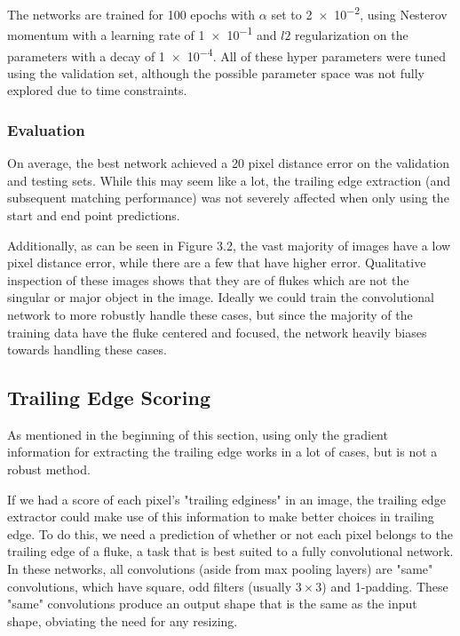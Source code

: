 The networks are trained for 100 epochs with $\alpha$ set to \num{2e-2}, using Nesterov momentum with a learning rate of \num{1e-1} and $l2$ regularization on the parameters with a decay of \num{1e-4}.
All of these hyper parameters were tuned using the validation set, although the possible parameter space was not fully explored due to time constraints.

\subsubsection{Evaluation}


On average, the best network achieved a 20 pixel distance error on the validation and testing sets.
While this may seem like a lot, the trailing edge extraction (and subsequent matching performance) was not severely affected when only using the start and end point predictions.

Additionally, as can be seen in Figure 3.2, the vast majority of images have a low pixel distance error, while there are a few that have higher error.
Qualitative inspection of these images shows that they are of flukes which are not the singular or major object in the image.
Ideally we could train the convolutional network to more robustly handle these cases, but since the majority of the training data have the fluke centered and focused, the network heavily biases towards handling these cases.

\subsection{Trailing Edge Scoring}

As mentioned in the beginning of this section, using only the gradient information for extracting the trailing edge works in a lot of cases, but is not a robust method.

If we had a score of each pixel's "trailing edginess" in an image, the trailing edge extractor could make use of this information to make better choices in trailing edge.
To do this, we need a prediction of whether or not each pixel belongs to the trailing edge of a fluke, a task that is best suited to a fully convolutional network.
In these networks, all convolutions (aside from max pooling layers) are "same" convolutions, which have square, odd filters (usually $3 \times 3$) and 1-padding.
These "same" convolutions produce an output shape that is the same as the input shape, obviating the need for any resizing.

